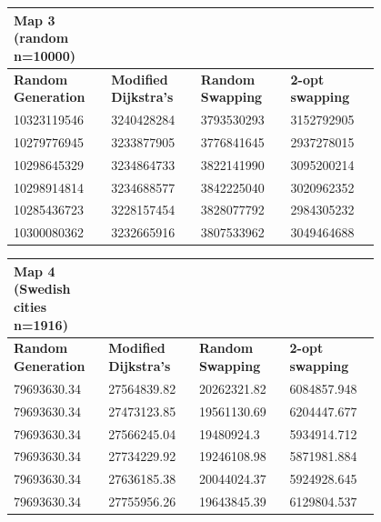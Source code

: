 \documentclass{article}
\begin{document}
\begin{table}[H]
    \centering
    \begin{tabular}{|p{0.2\linewidth}|p{0.2\linewidth}|p{0.2\linewidth}|p{0.2\linewidth}|}
    \hline
        \textbf{Map 3 (random n=10000)} & ~ & ~ & ~ \\ \hline
        \textbf{Random Generation} & \textbf{Modified Dijkstra's} & \textbf{Random Swapping} & \textbf{2-opt swapping} \\ \hline
        10323119546 & 3240428284 & 3793530293 & 3152792905 \\ \hline
        10279776945 & 3233877905 & 3776841645 & 2937278015 \\ \hline
        10298645329 & 3234864733 & 3822141990 & 3095200214 \\ \hline
        10298914814 & 3234688577 & 3842225040 & 3020962352 \\ \hline
        10285436723 & 3228157454 & 3828077792 & 2984305232 \\ \hline
        10300080362 & 3232665916 & 3807533962 & 3049464688 \\ \hline
    \end{tabular}
\end{table}

\begin{table}[H]
    \centering
    \begin{tabular}{|p{0.2\linewidth}|p{0.2\linewidth}|p{0.2\linewidth}|p{0.2\linewidth}|}
    \hline
        \textbf{Map 4 (Swedish cities n=1916)} & ~ & ~ & ~ \\ \hline
        \textbf{Random Generation} & \textbf{Modified Dijkstra's} & \textbf{Random Swapping} & \textbf{2-opt swapping} \\ \hline
        79693630.34 & 27564839.82 & 20262321.82 & 6084857.948 \\ \hline
        79693630.34 & 27473123.85 & 19561130.69 & 6204447.677 \\ \hline
        79693630.34 & 27566245.04 & 19480924.3 & 5934914.712 \\ \hline
        79693630.34 & 27734229.92 & 19246108.98 & 5871981.884 \\ \hline
        79693630.34 & 27636185.38 & 20044024.37 & 5924928.645 \\ \hline
        79693630.34 & 27755956.26 & 19643845.39 & 6129804.537 \\ \hline
    \end{tabular}
\end{table}
\end{document}
